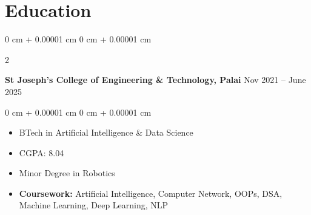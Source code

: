 \documentclass[10pt, letterpaper]{article}
\newenvironment{highlights}{
    \begin{itemize}[
        topsep=0.10 cm,
        parsep=0.10 cm,
        partopsep=0pt,
        itemsep=0pt,
        leftmargin=0 cm + 10pt
    ]
}{
    \end{itemize}
} %
\newenvironment{highlightsforbulletentries}{
    \begin{itemize}[
        topsep=0.10 cm,
        parsep=0.10 cm,
        partopsep=0pt,
        itemsep=0pt,
        leftmargin=10pt
    ]
}{
    \end{itemize}
} %
\newenvironment{onecolentry}{
    \begin{adjustwidth}{
        0 cm + 0.00001 cm
    }{
        0 cm + 0.00001 cm
    }
}{
    \end{adjustwidth}
} %
\newenvironment{twocolentry}[2][]{
    \onecolentry
    \def\secondColumn{#2}
    \setcolumnwidth{\fill, 4.5 cm}
    \begin{paracol}{2}
}{
    \switchcolumn \raggedleft \secondColumn
    \end{paracol}
    \endonecolentry
} %
\begin{document}






\section{Education}

\begin{twocolentry}{
		Nov 2021 – June 2025
	}
	\textbf{St Joseph's College of Engineering \& Technology, Palai}\end{twocolentry}

\vspace{0.10 cm}
\begin{onecolentry}
	\begin{highlights}
		\item BTech in Artificial Intelligence \& Data Science
		\item CGPA: 8.04 %
		\item Minor Degree in Robotics
		\item \textbf{Coursework:} Artificial Intelligence, Computer Network, OOPs, DSA, Machine Learning, Deep Learning, NLP
	\end{highlights}
\end{onecolentry}


\end{document}
